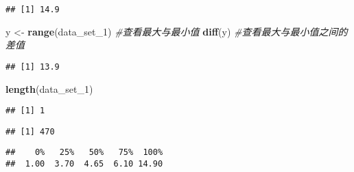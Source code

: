 \documentclass[
]{book}
\newenvironment{Shaded}{\begin{snugshade}}{\end{snugshade}}
\newcommand{\CommentTok}[1]{\textcolor[rgb]{0.56,0.35,0.01}{\textit{#1}}}
\newcommand{\FloatTok}[1]{\textcolor[rgb]{0.00,0.00,0.81}{#1}}
\newcommand{\FunctionTok}[1]{\textcolor[rgb]{0.13,0.29,0.53}{\textbf{#1}}}
\newcommand{\NormalTok}[1]{#1}
\newcommand{\OtherTok}[1]{\textcolor[rgb]{0.56,0.35,0.01}{#1}}
\newcommand{\SpecialCharTok}[1]{\textcolor[rgb]{0.81,0.36,0.00}{\textbf{#1}}}
\theoremstyle{definition}
\theoremstyle{definition}
\theoremstyle{definition}
\theoremstyle{definition}
\theoremstyle{remark}
\begin{document}
\begin{verbatim}
## [1] 14.9
\end{verbatim}

\begin{Shaded}
\begin{Highlighting}[]
\NormalTok{y }\OtherTok{\textless{}{-}} \FunctionTok{range}\NormalTok{(data\_set\_1) }\CommentTok{\#查看最大与最小值}
\FunctionTok{diff}\NormalTok{(y) }\CommentTok{\#查看最大与最小值之间的差值}
\end{Highlighting}
\end{Shaded}

\begin{verbatim}
## [1] 13.9
\end{verbatim}

\begin{Shaded}
\begin{Highlighting}[]
\FunctionTok{length}\NormalTok{(data\_set\_1)}
\end{Highlighting}
\end{Shaded}

\begin{verbatim}
## [1] 1
\end{verbatim}

\begin{Shaded}
\end{Shaded}

\begin{verbatim}
## [1] 470
\end{verbatim}

\begin{Shaded}
\end{Shaded}

\begin{verbatim}
##    0%   25%   50%   75%  100% 
##  1.00  3.70  4.65  6.10 14.90
\end{verbatim}

\begin{Shaded}
\end{Shaded}
\end{document}
